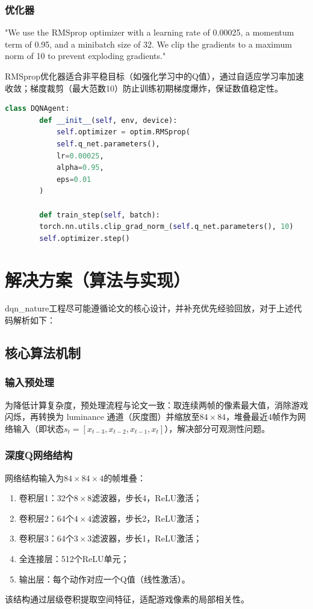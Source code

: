 \documentclass[conference]{IEEEtran}
\begin{document}
	\subsubsection{优化器}
	"We use the RMSprop optimizer with a learning rate of 0.00025, a momentum term of 0.95, and a minibatch size of 32. We clip the gradients to a maximum norm of 10 to prevent exploding gradients.\cite{1}"  
	
	RMSprop优化器适合非平稳目标（如强化学习中的Q值），通过自适应学习率加速收敛；梯度裁剪（最大范数10）防止训练初期梯度爆炸，保证数值稳定性。
	\begin{lstlisting}[language=Python,caption=DQNAgent]
	class DQNAgent:
		def __init__(self, env, device):
			self.optimizer = optim.RMSprop(
			self.q_net.parameters(),
			lr=0.00025,  
			alpha=0.95,  
			eps=0.01    
		)
		
		def train_step(self, batch):
		torch.nn.utils.clip_grad_norm_(self.q_net.parameters(), 10)
		self.optimizer.step()
	\end{lstlisting}
	
	\section{解决方案（算法与实现）}
	dqn\_nature工程尽可能遵循论文的核心设计，并补充优先经验回放，对于上述代码解析如下：
	
	\subsection{核心算法机制}
	\subsubsection{输入预处理}
	为降低计算复杂度，预处理流程与论文一致：取连续两帧的像素最大值，消除游戏闪烁，再转换为 luminance 通道（灰度图）并缩放至$84 \times 84$，堆叠最近4帧作为网络输入（即状态$s_t = [x_{t-3}, x_{t-2}, x_{t-1}, x_t]$），解决部分可观测性问题。
	
	\subsubsection{深度Q网络结构}
	网络结构输入为$84 \times 84 \times 4$的帧堆叠：
	\begin{enumerate}
		\item 卷积层1：32个$8 \times 8$滤波器，步长4，ReLU激活；
		\item 卷积层2：64个$4 \times 4$滤波器，步长2，ReLU激活；
		\item 卷积层3：64个$3 \times 3$滤波器，步长1，ReLU激活；
		\item 全连接层：512个ReLU单元；
		\item 输出层：每个动作对应一个Q值（线性激活）。
	\end{enumerate}
	该结构通过层级卷积提取空间特征，适配游戏像素的局部相关性。
	
\end{document}
